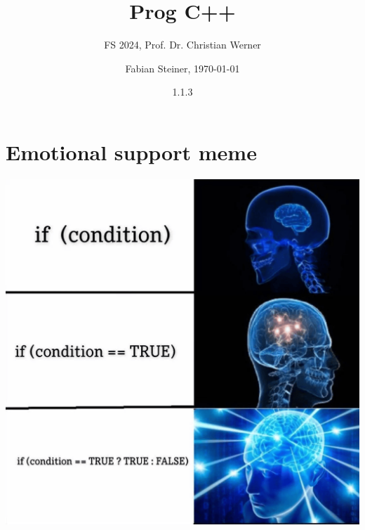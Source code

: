 \documentclass[fontsize=8pt, a4paper, fleqn, landscape, DIV=calc]{scrartcl}
\title{\vspace{-1cm}Prog C++}
\subtitle{FS 2024, Prof. Dr. Christian Werner}
\author{Fabian Steiner, \today}
\date{{\small 1.1.3}}
\begin{document}
	\begin{multicols*}{3}
        \begin{minipage}{0.75\columnwidth}
		      \maketitle
        \end{minipage}
        \begin{minipage}{0.2\columnwidth}
            \begin{center}
                \quad
                \qquad    
            \end{center}
        \end{minipage}
        
        \thispagestyle{fancy}%

        
        
        
        
        
        \section{Emotional support meme}
        
        \begin{center}
            \includegraphics[width=\columnwidth]{pictures/ifcondition.png}  
        \end{center}            

	\end{multicols*}
\end{document}
